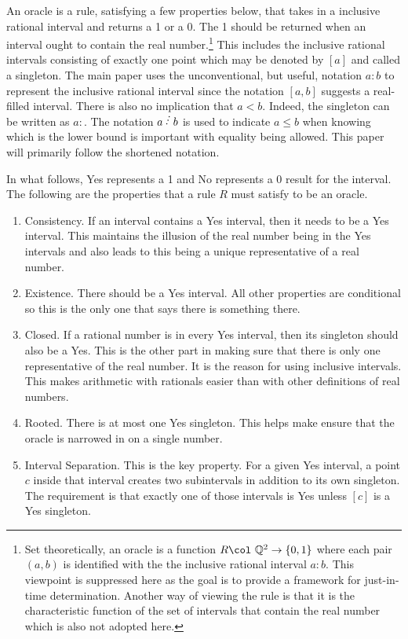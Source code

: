 \documentclass[12pt]{article}
\theoremstyle{remark}
\begin{document}
An oracle is a rule, satisfying a few properties below, that takes in a inclusive rational interval and returns a 1 or a 0. The 1 should be returned when an interval ought to contain the real number.\footnote{Set theoretically, an oracle is a function $R \col \ \mathbb{Q}^2 \to \{0,1\}$ where each pair $(a,b)$ is identified with the  the inclusive rational interval $a:b$. This viewpoint is suppressed here as the goal is to provide a framework for just-in-time determination. Another way of viewing the rule is that it is the characteristic function of the set of intervals that contain the real number which is also not adopted here.} This includes the inclusive rational intervals consisting of exactly one point which may be denoted by $[a]$ and called a singleton. The main paper uses the unconventional, but useful, notation $a:b$ to represent the inclusive rational interval since the notation $[a,b]$ suggests a real-filled interval. There is also no implication that $a < b$.  Indeed, the singleton can be written as $a:$. The notation $a\lte b$ is used to indicate $a\leq b$ when knowing which is the lower bound is important with equality being allowed. This paper will primarily follow the shortened notation. 

In what follows, Yes represents a 1 and No represents a 0 result for the interval. The following are the properties that a rule $R$ must satisfy to be an oracle. 

\begin{enumerate}
    \item Consistency. If an interval contains a Yes interval, then it needs to be a Yes interval. This maintains the illusion of the real number being in the Yes intervals and also leads to this being a unique representative of a real number. 
    \item Existence. There should be a Yes interval. All other properties are conditional so this is the only one that says there is something there. 
    \item Closed. If a rational number is in every Yes interval, then its singleton should also be a Yes. This is the other part in making sure that there is only one representative of the real number. It is the reason for using inclusive intervals. This makes arithmetic with rationals easier than with other definitions of real numbers.
    \item Rooted. There is at most one Yes singleton.  This helps make ensure that the oracle is narrowed in on a single number. 
    \item Interval Separation. This is the key property. For a given Yes interval, a point $c$ inside that interval creates two subintervals in addition to its own singleton. The requirement is that exactly one of those intervals is Yes unless $[c]$ is a Yes singleton. 
\end{enumerate}
\end{document}
